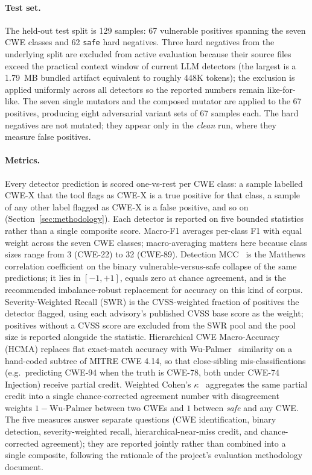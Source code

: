 \paragraph{Test set.} The held-out test split is 129 samples: 67
vulnerable positives spanning the seven CWE classes and 62 \texttt{safe}
hard negatives. Three hard negatives from the underlying split are
excluded from active evaluation because their source files exceed the
practical context window of current LLM detectors (the largest is a
1.79~MB bundled artifact equivalent to roughly 448K tokens); the
exclusion is applied uniformly across all detectors so the reported
numbers remain like-for-like. The seven single mutators and the composed
mutator are applied to the 67 positives, producing eight adversarial
variant sets of 67 samples each. The hard negatives are not mutated;
they appear only in the \emph{clean} run, where they measure false
positives.

\paragraph{Metrics.} Every detector prediction is scored one-vs-rest per
CWE class: a sample labelled CWE-X that the tool flags as CWE-X is a
true positive for that class, a sample of any other label flagged as
CWE-X is a false positive, and so on (Section~\ref{sec:methodology}).
Each detector is reported on five bounded statistics rather than a
single composite score. Macro-F1 averages per-class F1 with equal
weight across the seven CWE classes; macro-averaging matters here
because class sizes range from 3 (CWE-22) to 32 (CWE-89). Detection
MCC~\cite{chicco2020mcc} is the Matthews correlation coefficient on the
binary vulnerable-versus-safe collapse of the same predictions; it lies
in $[-1, +1]$, equals zero at chance agreement, and is the recommended
imbalance-robust replacement for accuracy on this kind of corpus.
Severity-Weighted Recall (SWR) is the CVSS-weighted fraction of
positives the detector flagged, using each advisory's published CVSS
base score as the weight; positives without a CVSS score are excluded
from the SWR pool and the pool size is reported alongside the
statistic. Hierarchical CWE Macro-Accuracy (HCMA) replaces flat
exact-match accuracy with Wu-Palmer~\cite{wupalmer1994} similarity on
a hand-coded subtree of MITRE CWE 4.14, so that close-sibling
mis-classifications (e.g.\ predicting CWE-94 when the truth is
CWE-78, both under CWE-74 Injection) receive partial credit. Weighted
Cohen's $\kappa$~\cite{cohen1968kappa} aggregates the same partial
credit into a single chance-corrected agreement number with
disagreement weights $1 - \text{Wu-Palmer}$ between two CWEs and $1$
between \emph{safe} and any CWE. The five measures answer separate
questions (CWE identification, binary detection, severity-weighted
recall, hierarchical-near-miss credit, and chance-corrected
agreement); they are reported jointly rather than combined into a
single composite, following the rationale of the project's evaluation
methodology document.


